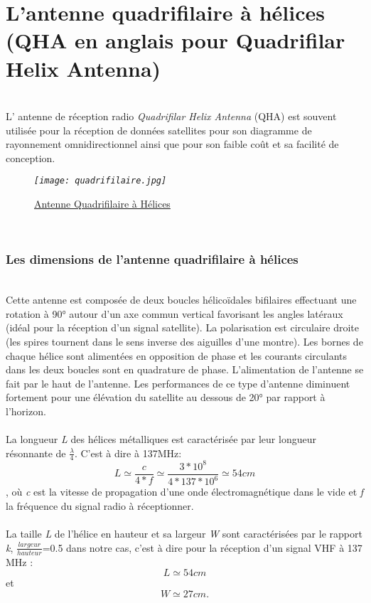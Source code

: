 \documentclass[12pt,fleqn]{book} %
\begin{document}
\section{L'antenne quadrifilaire à hélices (QHA en anglais pour Quadrifilar Helix Antenna)}
~\\\indent L' antenne de réception radio \emph{Quadrifilar Helix Antenna} (QHA) est souvent utilisée pour la réception de données satellites pour son diagramme de rayonnement omnidirectionnel ainsi que pour son faible coût et sa facilité de conception.
\begin{figure}[H]
	\centering
	\itshape
	\texttt{[image: quadrifilaire.jpg]}
	\caption{\label{QHA} \underline{Antenne Quadrifilaire à Hélices}}
\end{figure}
~\\
\subsubsection{Les dimensions de l'antenne quadrifilaire à hélices}
~\\
Cette antenne est composée de deux boucles hélicoïdales bifilaires effectuant une rotation à 90° autour d'un axe commun vertical favorisant les angles latéraux (idéal pour la réception d'un signal satellite). La polarisation est circulaire droite (les spires tournent dans le sens inverse des aiguilles d'une montre). Les bornes de chaque hélice sont alimentées en opposition de phase et les courants circulants dans les deux boucles sont en quadrature de phase. L'alimentation de l'antenne se fait par le haut de l'antenne. Les performances de ce type d'antenne diminuent fortement pour une élévation du satellite au dessous de 20° par rapport à l'horizon.
~\\\\La longueur \emph{L} des hélices métalliques est caractérisée par leur longueur résonnante de \(\frac{\lambda}{4}\). C'est à dire à 137MHz:
$$ L\simeq\frac{c}{4*f}\simeq\frac{3*10^8}{4*137*10^6}\simeq54 cm $$, où \emph{c} est la vitesse de propagation d'une onde électromagnétique dans le vide et \emph{f} la fréquence du signal radio à réceptionner.
~\\\\La taille \emph{L} de l'hélice en hauteur et sa largeur \emph{W} sont caractérisées par le rapport \emph{k}, \(\frac{largeur}{hauteur}\)=0.5 dans notre cas, c'est à dire pour la réception d'un signal VHF à 137 MHz : 
$$ L\simeq54 cm $$
et 
$$ W\simeq27 cm. $$
\end{document}
